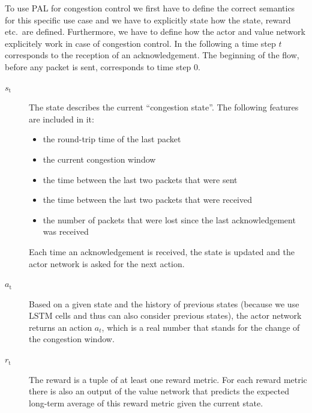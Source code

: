 \documentclass[sigconf]{acmart}
\begin{document}
To use PAL for congestion control we first have to define the correct semantics for this specific use case and we have to explicitly state how the state, reward etc.~are defined. Furthermore, we have to define how the actor and value network explicitely work in case of congestion control. In the following a time step $t$ corresponds to the reception of an acknowledgement. The beginning of the flow, before any packet is sent, corresponds to time step $0$.

\begin{description}
\item[$\textit{s}_\text{t}$] The state  describes the current ``congestion state''. The following features are included in it:
\begin{itemize}
\item the round-trip time of the last packet
\item the current congestion window
\item the time between the last two packets that were sent
\item the time between the last two packets that were received
\item the number of packets that were lost since the last acknowledgement was received
\end{itemize}
Each time an acknowledgement is received, the state is updated and the actor network is asked for the next action.
\item[$\textit{a}_\text{t}$] Based on a given state and the history of previous states (because we use LSTM cells and thus can also consider previous states), the actor network returns an action $a_t$, which is a real number that stands for the change of the congestion window. 
\item[$\textit{r}_\text{t}$] The reward is a tuple of at least one reward metric. 
For each reward metric there is also an output of the value network that predicts the expected long-term average of this reward metric given the current state. 
\end{description}
\end{document}
